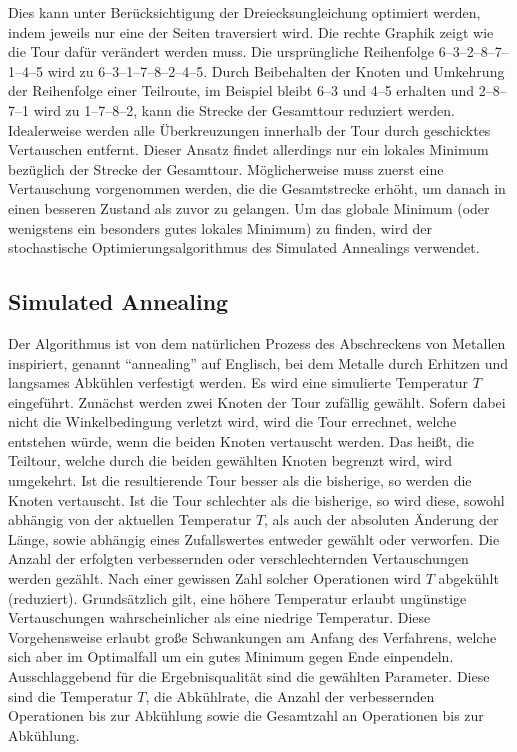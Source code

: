 Dies kann unter Berücksichtigung der Dreiecksungleichung optimiert werden, indem jeweils nur eine der Seiten traversiert wird.
Die rechte Graphik zeigt wie die Tour dafür verändert werden muss.
Die ursprüngliche Reihenfolge 6--3--2--8--7--1--4--5 wird zu 6--3--1--7--8--2--4--5.
Durch Beibehalten der Knoten und Umkehrung der Reihenfolge einer Teilroute,
im Beispiel bleibt 6--3 und 4--5 erhalten und 2--8--7--1 wird zu 1--7--8--2, kann die Strecke der Gesamttour reduziert werden. \\
Idealerweise werden alle Überkreuzungen innerhalb der Tour durch geschicktes Vertauschen entfernt.
Dieser Ansatz findet allerdings nur ein lokales Minimum bezüglich der Strecke der Gesamttour.
Möglicherweise muss zuerst eine Vertauschung vorgenommen werden, die die Gesamtstrecke erhöht, um
danach in einen besseren Zustand als zuvor zu gelangen.
Um das globale Minimum (oder wenigstens ein besonders gutes lokales Minimum) zu finden, wird der stochastische
Optimierungsalgorithmus des Simulated Annealings verwendet.

\subsection{Simulated Annealing}\label{subsec:simulated-annealing}
Der Algorithmus ist von dem natürlichen Prozess des Abschreckens von Metallen inspiriert, genannt ``annealing'' auf
Englisch, bei dem Metalle durch Erhitzen und langsames Abkühlen verfestigt werden.
Es wird eine simulierte Temperatur $T$ eingeführt.
Zunächst werden zwei Knoten der Tour zufällig gewählt.
Sofern dabei nicht die Winkelbedingung verletzt wird, wird die Tour errechnet, welche entstehen würde,
wenn die beiden Knoten vertauscht werden.
Das hei{\ss}t, die Teiltour, welche durch die beiden gewählten Knoten begrenzt wird, wird umgekehrt.
Ist die resultierende Tour besser als die bisherige, so werden die Knoten vertauscht.
Ist die Tour schlechter als die bisherige, so wird diese, sowohl abhängig von der
aktuellen Temperatur $T$, als auch der absoluten Änderung der Länge, sowie abhängig eines
Zufallswertes entweder gewählt oder verworfen.
Die Anzahl der erfolgten verbessernden oder verschlechternden Vertauschungen werden gezählt.
Nach einer gewissen Zahl solcher Operationen wird $T$ abgekühlt (reduziert).
Grundsätzlich gilt, eine höhere Temperatur erlaubt ungünstige Vertauschungen wahrscheinlicher als eine niedrige Temperatur.
Diese Vorgehensweise erlaubt gro{\ss}e Schwankungen am Anfang des Verfahrens, welche sich aber im Optimalfall um ein gutes
Minimum gegen Ende einpendeln.
Ausschlaggebend für die Ergebnisqualität sind die gewählten Parameter.
Diese sind die Temperatur $T$, die Abkühlrate, die Anzahl der verbessernden Operationen bis zur Abkühlung sowie die Gesamtzahl
an Operationen bis zur Abkühlung.


